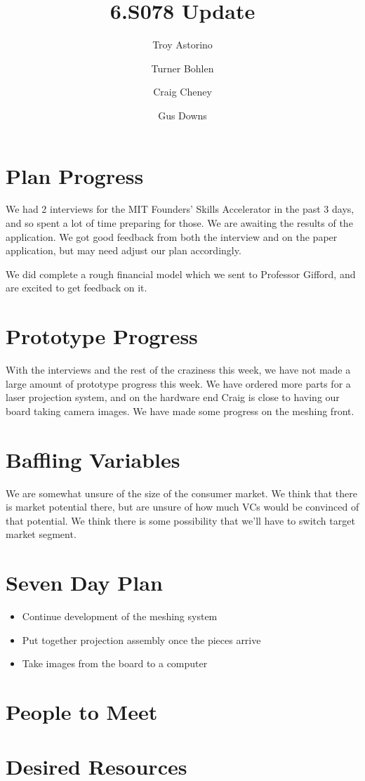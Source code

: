 \documentclass[10pt]{article}
\title{\vspace{-4em}6.S078 Update}
\author{Troy Astorino \and Turner Bohlen \and Craig Cheney \and Gus Downs}
\begin{document}
\maketitle
\vspace{-4em}

\section{Plan Progress}
We had 2 interviews for the MIT Founders' Skills Accelerator in the past 3 days,
and so spent a lot of time preparing for those. We are awaiting the results of
the application. We got good feedback from both the interview and on the paper
application, but may need adjust our plan accordingly.

We did complete a rough financial model which we sent to Professor Gifford, and
are excited to get feedback on it.

\section{Prototype Progress}
With the interviews and the rest of the craziness this week, we have not made a
large amount of prototype progress this week. We have ordered more parts for a
laser projection system, and on the hardware end Craig is close to having our
board taking camera images. We have made some progress on the meshing front.

\section{Baffling Variables}
We are somewhat unsure of the size of the consumer market.  We think that there
is market potential there, but are unsure of how much VCs would be convinced of
that potential. We think there is some possibility that we'll have to switch
target market segment.

\section{Seven Day Plan}
\begin{itemize}
\item Continue development of the meshing system
\item Put together projection assembly once the pieces arrive
\item Take images from the board to a computer
\end{itemize}
\section{People to Meet}

\section{Desired Resources}
\end{document}
